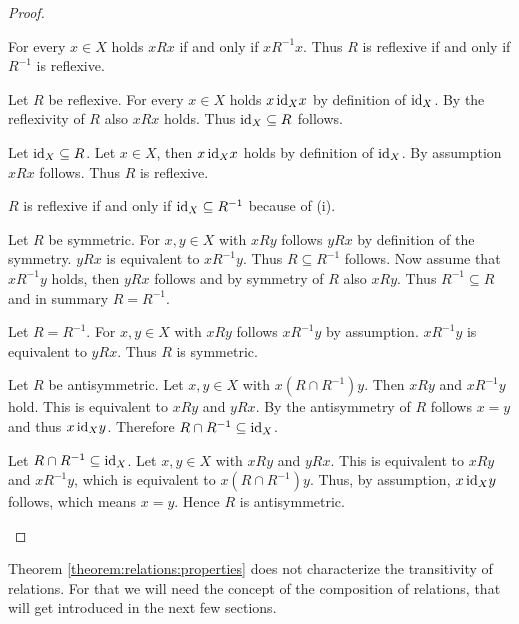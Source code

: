 \begin{proof}
    \begin{proofenumerate}
        \item For every $x\in X$ holds $x R x$ if and only if $x R^{-1} x$. Thus $R$ is reflexive if and only if $R^{-1}$ is reflexive.
        
        \item \proofright Let $R$ be reflexive. For every $x\in X$ holds $x\,\text{id}_X x$ by definition of $\text{id}_X$. By the reflexivity of $R$ also $xRx$ holds. Thus $\text{id}_X\subseteq R$ follows.
        
        \proofleft Let $\text{id}_X\subseteq R$. Let $x\in X$, then $x\,\text{id}_X x$ holds by definition of $\text{id}_X$. By assumption $xRx$ follows. Thus $R$ is reflexive.

        $R$ is reflexive if and only if $\text{id}_X\subseteq R^{-1}$ because of (i).

        \item \proofright Let $R$ be symmetric. For $x,y\in X$ with $x R y$ follows $y R x$ by definition of the symmetry. $y R x$ is equivalent to $x R^{-1} y$. Thus $R\subseteq R^{-1}$ follows. Now assume that $x R^{-1} y$ holds, then $y R x$ follows and by symmetry of $R$ also $x R y$. Thus $R^{-1}\subseteq R$ and in summary $R=R^{-1}$.
        
        \proofleft Let $R=R^{-1}$. For $x,y\in X$ with $x R y$ follows $x R^{-1} y$ by assumption. $x R^{-1} y$ is equivalent to $y R x$. Thus $R$ is symmetric.

        \item \proofright Let $R$ be antisymmetric. Let $x,y\in X$ with $x(R\cap R^{-1})y$. Then $x R y$ and $x R^{-1} y$ hold. This is equivalent to $x R y$ and $y R x$. By the antisymmetry of $R$ follows $x=y$ and thus $x\,\text{id}_X y$. Therefore $R\cap R^{-1}\subseteq \text{id}_X$.
        
        \proofleft Let $R\cap R^{-1}\subseteq \text{id}_X$. Let $x,y\in X$ with $x R y$ and $y R x$. This is equivalent to $x R y$ and $x R^{-1} y$, which is equivalent to $x(R\cap R^{-1})y$. Thus, by assumption, $x\,\text{id}_X y$ follows, which means $x=y$. Hence $R$ is antisymmetric.
    \end{proofenumerate}
\end{proof}

Theorem \ref{theorem:relations:properties} does not characterize the transitivity of relations. For that we will need the concept of the composition of relations, that will get introduced in the next few sections.

